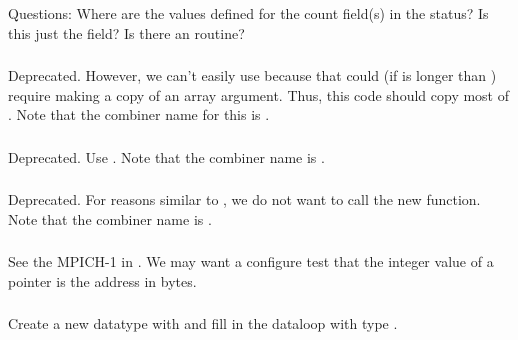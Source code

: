 \documentclass{article}
\begin{document}
\subsubsection{}
Questions: Where are the values defined for the count field(s) in the status?
Is this just the  field?  Is there an
 routine?

\subsubsection{}
Deprecated.  However, we can't easily use 
because that could (if  is longer than ) require
making a copy of an array argument.  Thus, this code should copy most
of .  Note that the combiner name for this
is .

\subsubsection{}
Deprecated.  Use .  Note that the combiner
name is .

\subsubsection{}
Deprecated.  For reasons similar to , we do
not want to call the new function.  Note that the combiner name is
. 

\subsubsection{}
See the MPICH-1  in .
We may want a configure test that the integer value of a  pointer
is the address in bytes.

\subsubsection{}
Create a new datatype with  and fill in the dataloop
with type .  
\end{document}
